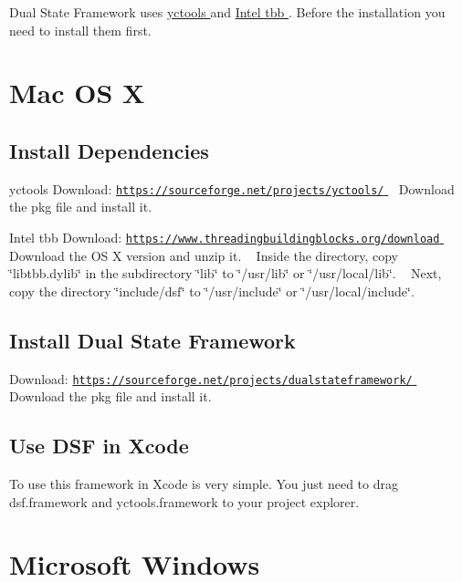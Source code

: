 Dual State Framework uses \hyperlink{}{yctools } and \hyperlink{}{Intel tbb }. Before the installation you need to install them first.\hypertarget{_installation_Mac}{}\section{Mac O\+S X}\label{_installation_Mac}
\hypertarget{_installation_dependencies_mac}{}\subsection{Install Dependencies}\label{_installation_dependencies_mac}
\begin{DoxyParagraph}{yctools}
Download\+: \hyperlink{}{\href{https://sourceforge.net/projects/yctools/}{\tt https\+://sourceforge.\+net/projects/yctools/} } ~\newline
 Download the pkg file and install it.
\end{DoxyParagraph}
\begin{DoxyParagraph}{Intel tbb}
Download\+: \hyperlink{}{\href{https://www.threadingbuildingblocks.org/download}{\tt https\+://www.\+threadingbuildingblocks.\+org/download} } ~\newline
 Download the O\+S X version and unzip it. ~\newline
 Inside the directory, copy \char`\"{}libtbb.\+dylib\char`\"{} in the subdirectory \char`\"{}lib\char`\"{} to \char`\"{}/usr/lib\char`\"{} or \char`\"{}/usr/local/lib\char`\"{}. ~\newline
 Next, copy the directory \char`\"{}include/dsf\char`\"{} to \char`\"{}/usr/include\char`\"{} or \char`\"{}/usr/local/include\char`\"{}.
\end{DoxyParagraph}
\hypertarget{_installation_dsf_mac}{}\subsection{Install Dual State Framework}\label{_installation_dsf_mac}
Download\+: \hyperlink{}{\href{https://sourceforge.net/projects/dualstateframework/}{\tt https\+://sourceforge.\+net/projects/dualstateframework/} } ~\newline
 Download the pkg file and install it.\hypertarget{_installation_use_mac}{}\subsection{Use D\+S\+F in Xcode}\label{_installation_use_mac}
To use this framework in Xcode is very simple. You just need to drag dsf.\+framework and yctools.\+framework to your project explorer.\hypertarget{_installation_Win}{}\section{Microsoft Windows}\label{_installation_Win}
